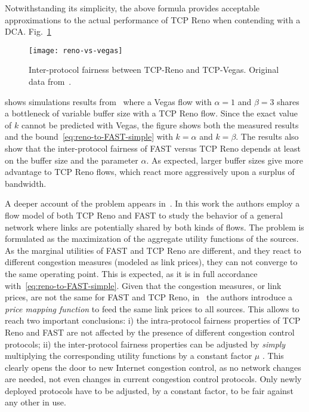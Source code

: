 \documentclass[english,times]{ettauth}
\begin{document}
Notwithstanding its simplicity, the above formula provides acceptable
approximations to the actual performance of TCP Reno when contending with a
DCA. Fig.~\ref{fig:reno-vs-vegas-fairness}
\begin{figure}
  \centering
  \texttt{[image: reno-vs-vegas]}
  \caption{Inter-protocol fairness between TCP-Reno and TCP-Vegas. Original
    data from~\cite{Mo99}.}
  \label{fig:reno-vs-vegas-fairness}
\end{figure}
shows simulations results from~\cite{Mo99} where a Vegas flow with $\alpha=1$
and $\beta=3$ shares a bottleneck of variable buffer size with a TCP Reno
flow. Since the exact value of $k$ cannot be predicted with Vegas, the figure
shows both the measured results and the bound~\eqref{eq:reno-to-FAST-simple}
with $k = \alpha$ and $k = \beta$. The results also show that the
inter-protocol fairness of FAST versus TCP Reno depends at least on the buffer
size and the parameter $\alpha$. As expected, larger buffer sizes give more
advantage to TCP Reno flows, which react more aggressively upon a surplus of
bandwidth.

A deeper account of the problem appears in~\cite{Tang05}. In this work the
authors employ a flow model of both TCP Reno and FAST to study the behavior of
a general network where links are potentially shared by both kinds of flows.
The problem is formulated as the maximization of the aggregate utility
functions of the sources. As the marginal utilities of FAST and TCP Reno are
different, and they react to different congestion measures (modeled as link
prices), they can not converge to the same operating point. This is expected,
as it is in full accordance with~\eqref{eq:reno-to-FAST-simple}. Given that
the congestion measures, or link prices, are not the same for FAST and TCP
Reno, in~\cite{Tang05} the authors introduce a \emph{price mapping function}
to feed the same link prices to all sources. This allows to reach two
important conclusions: i) the intra-protocol fairness properties of TCP Reno
and FAST are not affected by the presence of different congestion control
protocols; ii) the inter-protocol fairness properties can be adjusted by
\emph{simply} multiplying the corresponding utility functions by a constant
factor $\mu$ . This clearly opens the door to new Internet congestion control,
as no network changes are needed, not even changes in current congestion
control protocols. Only newly deployed protocols have to be adjusted, by a
constant factor, to be fair against any other in use.
\end{document}
